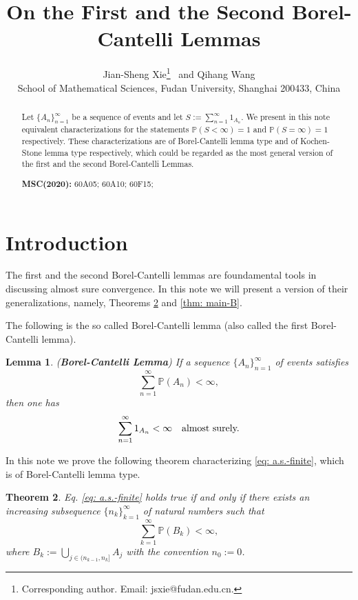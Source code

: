 \documentclass{article}
\title{On the First and the Second Borel-Cantelli Lemmas}%
\author{Jian-Sheng Xie\footnote{Corresponding author. Email: jsxie@fudan.edu.cn.} \, and Qihang Wang\\
%
{\footnotesize School of Mathematical Sciences, Fudan
University, Shanghai 200433,   China}} %
\date{}%
\newtheorem{thm}{Theorem}[section]
\newtheorem{lem}[thm]{Lemma}
\numberwithin{equation}{section}
\newcommand{\Pnum}{\mathbb{P}}
\begin{document}
\maketitle

\begin{abstract}
Let $\{A_n\}_{n=1}^\infty$ be a sequence of events and let $\displaystyle S:=\sum_{n=1}^\infty 1_{A_n}$. We present in this note equivalent characterizations for
the statements $\Pnum (S<\infty)=1$ and $\Pnum (S=\infty)=1$ respectively. These characterizations are of Borel-Cantelli lemma type and of Kochen-Stone lemma type
respectively, which could be regarded as the most general version of the first and the second Borel-Cantelli Lemmas.


\noindent\textbf{MSC(2020):} 60A05; 60A10; 60F15;
\end{abstract}

\section{Introduction}\label{sec: C1}
The first and the second Borel-Cantelli lemmas are foundamental tools in discussing almost sure convergence. In this note we will present a version of their
generalizations, namely, Theorems \ref{thm: main-A} and \ref{thm: main-B}. 

The following is the so called Borel-Cantelli lemma (also called the first Borel-Cantelli lemma).
\begin{lem} (\textbf{Borel-Cantelli Lemma})
If a sequence $\{A_n\}_{n=1}^\infty$ of events satisfies
\begin{equation}\label{eq: prob-sum-finite}
\sum_{n=1}^\infty \Pnum (A_n)<\infty,
\end{equation}
then one has
\begin{equation}\label{eq: a.s.-finite}
\sum_{n=1}^\infty 1_{A_n}<\infty \quad \hbox{almost surely.}
\end{equation}
\end{lem}
In this note we prove the following theorem characterizing \eqref{eq: a.s.-finite}, which is of Borel-Cantelli lemma type.
\begin{thm}\label{thm: main-A}
Eq. \eqref{eq: a.s.-finite} holds true if and only if there exists an increasing subsequence $\{n_k\}_{k=1}^\infty$ of natural numbers such that
\begin{equation}\label{eq: prob-sum-B-finite}
\sum_{k=1}^\infty \Pnum (B_k)<\infty,
\end{equation}
where $\displaystyle B_k:=\bigcup_{j \in (n_{k-1}, n_k]} A_j$ with the convention $n_0:=0$.
\end{thm}
\end{document}
